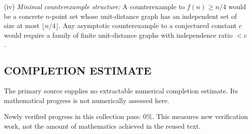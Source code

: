 (iv) \emph{Minimal counterexample structure:}
A counterexample to $f(n)\ge n/4$ would be a concrete $n$-point set whose unit-distance graph has an independent set of size at most $\lfloor n/4\rfloor$.  Any asymptotic counterexample to a conjectured constant $c$ would require a family of finite unit-distance graphs with independence ratio $<c$.




\subsection*{COMPLETION ESTIMATE}
The primary source supplies no extractable numerical completion estimate. Its mathematical progress is not numerically assessed here.

Newly verified progress in this collection pass: $0\%$. This measures new verification work, not the amount of mathematics achieved in the reused text.

